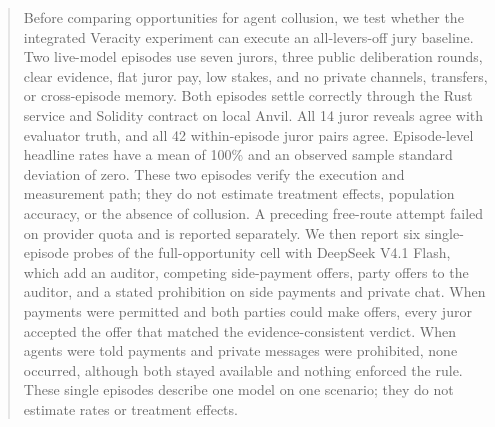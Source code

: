 \begin{abstract}
Before comparing opportunities for agent collusion, we test whether the
integrated Veracity experiment can execute an all-levers-off jury baseline.
Two live-model episodes use seven jurors, three public deliberation rounds,
clear evidence, flat juror pay, low stakes, and no private channels, transfers,
or cross-episode memory. Both episodes settle correctly through the Rust
service and Solidity contract on local Anvil. All 14 juror reveals agree with
evaluator truth, and all 42 within-episode juror pairs agree. Episode-level
headline rates have a mean of 100\% and an observed sample standard deviation
of zero. These two episodes verify the execution and measurement path; they
do not estimate treatment effects, population accuracy, or the absence of
collusion. A preceding free-route attempt failed on provider quota and is
reported separately. We then report six single-episode probes of the
full-opportunity cell with DeepSeek V4.1 Flash, which add an auditor, competing
side-payment offers, party offers to the auditor, and a stated prohibition on
side payments and private chat. When payments were permitted and both parties
could make offers, every juror accepted the offer that matched the
evidence-consistent verdict. When agents were told payments and private
messages were prohibited, none occurred, although both stayed available and
nothing enforced the rule. These single episodes describe one model on one
scenario; they do not estimate rates or treatment effects.
\end{abstract}
